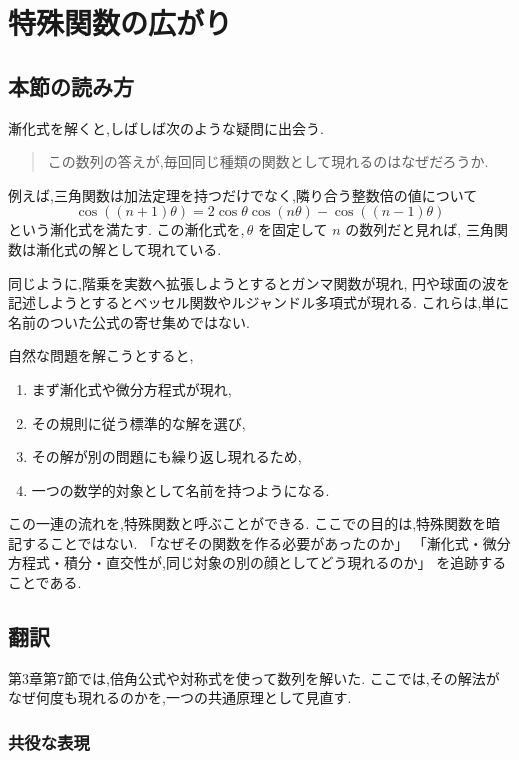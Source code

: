 
\section{特殊関数の広がり}


\subsection*{本節の読み方}

漸化式を解くと,しばしば次のような疑問に出会う.

\begin{quote}
  この数列の答えが,毎回同じ種類の関数として現れるのはなぜだろうか.
\end{quote}

例えば,三角関数は加法定理を持つだけでなく,隣り合う整数倍の値について
\[
  \cos((n+1)\theta)
  =2\cos\theta\cos(n\theta)-\cos((n-1)\theta)
\]
という漸化式を満たす.
この漸化式を,\,$\theta$ を固定して $n$ の数列だと見れば,
三角関数は漸化式の解として現れている.

同じように,階乗を実数へ拡張しようとするとガンマ関数が現れ,
円や球面の波を記述しようとするとベッセル関数やルジャンドル多項式が現れる.
これらは,単に名前のついた公式の寄せ集めではない.

自然な問題を解こうとすると,
\begin{enumerate}
  \item まず漸化式や微分方程式が現れ,
  \item その規則に従う標準的な解を選び,
  \item その解が別の問題にも繰り返し現れるため,
  \item 一つの数学的対象として名前を持つようになる.
\end{enumerate}

この一連の流れを,特殊関数と呼ぶことができる.
ここでの目的は,特殊関数を暗記することではない.
「なぜその関数を作る必要があったのか」
「漸化式・微分方程式・積分・直交性が,同じ対象の別の顔としてどう現れるのか」
を追跡することである.

\subsection{翻訳}

第3章第7節では,倍角公式や対称式を使って数列を解いた.
ここでは,その解法がなぜ何度も現れるのかを,一つの共通原理として見直す.

\subsubsection{共役な表現}

